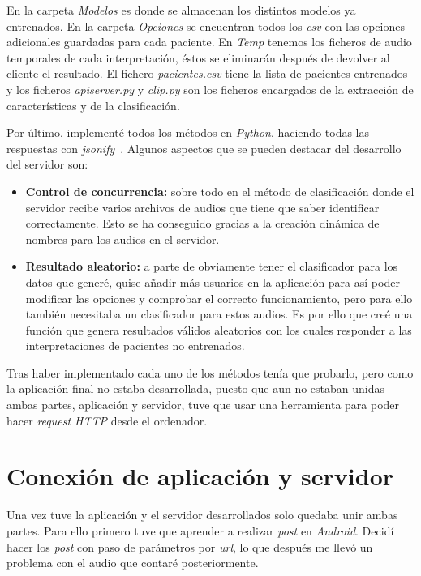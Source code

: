 
En la carpeta \textit{Modelos} es donde se almacenan los distintos modelos ya entrenados. En la carpeta \textit{Opciones} se encuentran todos los \textit{csv} con las opciones adicionales guardadas para cada paciente. En \textit{Temp} tenemos los ficheros de audio temporales de cada interpretación, éstos se eliminarán después de devolver al cliente el resultado. El fichero \textit{pacientes.csv} tiene la lista de pacientes entrenados y los ficheros \textit{apiserver.py} y \textit{clip.py} son los ficheros encargados de la extracción de características y de la clasificación.

Por último, implementé todos los métodos en \textit{Python}, haciendo todas las respuestas con \textit{jsonify}~\cite{jsonify}. Algunos aspectos que se pueden destacar del desarrollo del servidor son:
\begin{itemize}
	\item \textbf{Control de concurrencia:} sobre todo en el método de clasificación donde el servidor recibe varios archivos de audios que tiene que saber identificar correctamente. Esto se ha conseguido gracias a la creación dinámica de nombres para los audios en el servidor.
	\item \textbf{Resultado aleatorio:} a parte de obviamente tener el clasificador para los datos que generé, quise añadir más usuarios en la aplicación para así poder modificar las opciones y comprobar el correcto funcionamiento, pero para ello también necesitaba un clasificador para estos audios. Es por ello que creé una función que genera resultados válidos aleatorios con los cuales responder a las interpretaciones de pacientes no entrenados.
\end{itemize}

Tras haber implementado cada uno de los métodos tenía que probarlo, pero como la aplicación final no estaba desarrollada, puesto que aun no estaban unidas ambas partes, aplicación y servidor, tuve que usar una herramienta para poder hacer \textit{request HTTP} desde el ordenador.

\section{Conexión de aplicación y servidor}
Una vez tuve la aplicación y el servidor desarrollados solo quedaba unir ambas partes. Para ello primero tuve que aprender a realizar \textit{post} en \textit{Android}. Decidí hacer los \textit{post} con paso de parámetros por \textit{url}, lo que después me llevó un problema con el audio que contaré posteriormente.

